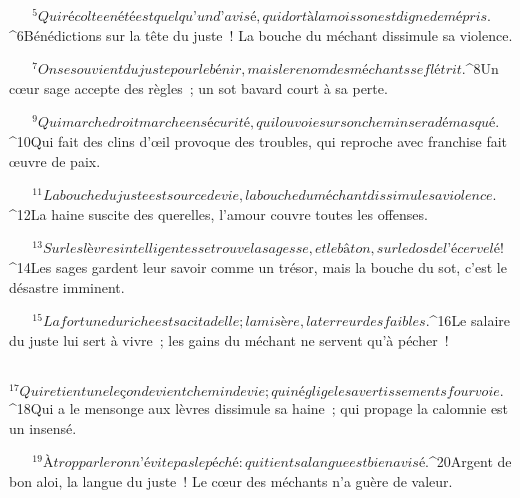            
         
${}^{5}Qui récolte en été est quelqu’un d’avisé,
        qui dort à la moisson est digne de mépris.
        
           
         
${}^{6}Bénédictions sur la tête du juste !
        La bouche du méchant dissimule sa violence.
        
           
         
${}^{7}On se souvient du juste pour le bénir,
        mais le renom des méchants se flétrit.
        
           
         
${}^{8}Un cœur sage accepte des règles ;
        un sot bavard court à sa perte.
        
           
         
${}^{9}Qui marche droit marche en sécurité,
        qui louvoie sur son chemin sera démasqué.
        
           
         
${}^{10}Qui fait des clins d’œil provoque des troubles,
        qui reproche avec franchise fait œuvre de paix.
        
           
         
${}^{11}La bouche du juste est source de vie,
        la bouche du méchant dissimule sa violence.
        
           
         
${}^{12}La haine suscite des querelles,
        l’amour couvre toutes les offenses.
        
           
         
${}^{13}Sur les lèvres intelligentes se trouve la sagesse,
        et le bâton, sur le dos de l’écervelé !
        
           
         
${}^{14}Les sages gardent leur savoir comme un trésor,
        mais la bouche du sot, c’est le désastre imminent.
        
           
         
${}^{15}La fortune du riche est sa citadelle ;
        la misère, la terreur des faibles.
        
           
         
${}^{16}Le salaire du juste lui sert à vivre ;
        les gains du méchant ne servent qu’à pécher !
        
           
         
${}^{17}Qui retient une leçon devient chemin de vie ;
        qui néglige les avertissements fourvoie.
        
           
         
${}^{18}Qui a le mensonge aux lèvres dissimule sa haine ;
        qui propage la calomnie est un insensé.
        
           
         
${}^{19}À trop parler on n’évite pas le péché :
        qui tient sa langue est bien avisé.
        
           
         
${}^{20}Argent de bon aloi, la langue du juste !
        Le cœur des méchants n’a guère de valeur.
        
